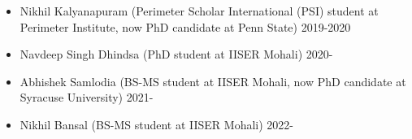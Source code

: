 \begin{itemize}
\vspace{1mm} 
  \item  Nikhil Kalyanapuram (Perimeter Scholar International (PSI) student at Perimeter Institute, now PhD candidate at Penn State) \hfill  2019-2020 
  \item  Navdeep Singh Dhindsa (PhD student at IISER Mohali) \hfill 2020- 
  \item  Abhishek Samlodia (BS-MS student at IISER Mohali, now PhD candidate at Syracuse University) \hfill 2021- 
  \item Nikhil Bansal (BS-MS student at IISER Mohali) \hfill 2022-
  \end{itemize}
